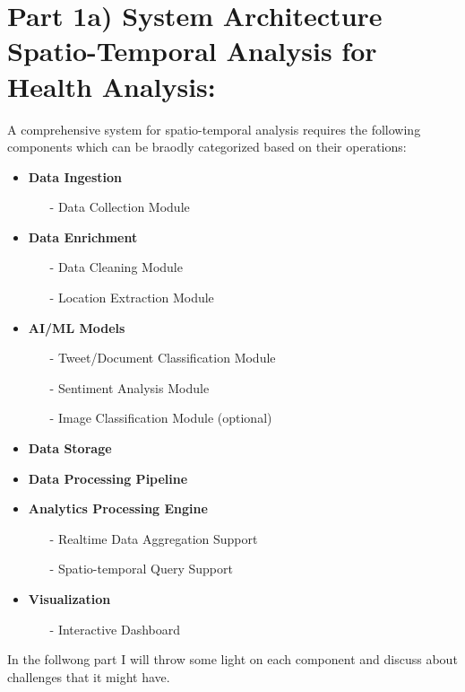 \section{Part 1a) System Architecture  Spatio-Temporal Analysis for Health Analysis:}
\label{part_a}
A comprehensive system for spatio-temporal analysis requires the following components which can be braodly categorized based on their operations:

\begin{itemize}
  \item \textbf{Data Ingestion}
    {\em
    \begin{itemize}
      \item[-] Data Collection Module
    \end{itemize}
    }
  \item \textbf{Data Enrichment}
    {\em
    \begin{itemize}
    \item[-] Data Cleaning Module
    \item[-] Location Extraction Module
    \end{itemize}
    }
  \item \textbf{AI/ML Models}
    {\em
    \begin{itemize}
      \item[-] Tweet/Document Classification Module
      \item[-] Sentiment Analysis Module
      \item[-] Image Classification Module (optional)
    \end{itemize}
    }
  \item \textbf{Data Storage}
  \item \textbf{Data Processing Pipeline}
  \item \textbf{Analytics Processing Engine}
    {\em
    \begin{itemize}
      \item[-] Realtime Data Aggregation Support
      \item[-] Spatio-temporal Query Support
    \end{itemize}
    }
  \item \textbf{Visualization}
    {\em
    \begin{itemize}
      \item[-] Interactive Dashboard
    \end{itemize}
    }
\end{itemize}

In the follwong part I will throw some light on each component and discuss about challenges that it might have.


